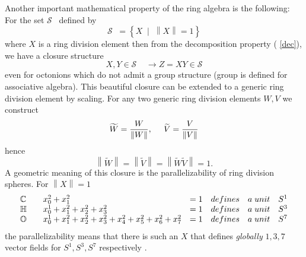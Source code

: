\documentclass[a4paper,12pt]{book}
\begin{document}
Another important mathematical property of the ring algebra is the
following: For the set $\mathcal{S\;\;\;}$defined by 
\begin{equation}
\mathcal{S\;\;}=\left\{ X\;\;|\;\;\left\| X\right\| =1\right\}
\end{equation}
where $X$ is a ring division element then from the decomposition property (%
\ref{dec}), we have a closure structure 
\begin{equation}
X,Y\in \mathcal{S\;\;\;\;}\rightarrow Z=XY\in \mathcal{S}
\end{equation}
even for octonions which do not admit a group structure (group is defined
for associative algebra). This beautiful closure can be extended to a
generic ring division element by scaling. For any two generic ring division
elements $W,V$ we construct 
\begin{equation}
\widetilde{W}=\frac{W}{\left\| W\right\| },\;\;\;\;\;\widetilde{V}=\frac{V}{%
\left\| V\right\| }
\end{equation}
hence 
\begin{equation}
\left\| \widetilde{W}\right\| =\left\| \widetilde{V}\right\| =\left\| 
\widetilde{W}\widetilde{V}\right\| =1.
\end{equation}
A geometric meaning of this closure is the parallelizability of ring
division spheres. For $\left\| X\right\| =1$%
\begin{equation}
\begin{array}{lllllll}
\Bbb{C} &  & x_{0}^{2}+x_{1}^{2} & =1 & defines & a\;unit & S^{1} \\ 
\Bbb{H} &  & x_{0}^{1}+x_{1}^{2}+x_{2}^{2}+x_{3}^{2} & =1 & defines & a\;unit
& S^{3} \\ 
\Bbb{O} &  & 
x_{0}^{1}+x_{1}^{2}+x_{2}^{2}+x_{3}^{2}+x_{4}^{2}+x_{5}^{2}+x_{6}^{2}+x_{7}^{2}
& =1 & defines & a\;unit & S^{7}
\end{array}
\end{equation}
the parallelizability means that there is such an $X$ that defines \emph{%
globally} $1,3,7$ vector fields for $S^{1},S^{3},S^{7}$ respectively \cite
{adams}\cite{husm}.
\end{document}
